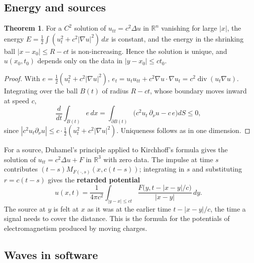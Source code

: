 \documentclass[11pt,a4paper]{article}
\numberwithin{equation}{section}
\theoremstyle{definition}
\newtheorem{thm}{Theorem}[subsection]
\begin{document}
\subsection{Energy and sources}
\label{ssec:energynd}

\begin{thm}
\label{thm:energynd}
For a $C^2$ solution of $u_{tt} = c^2\Delta u$ in $\mathbb R^n$ vanishing for large $|x|$, the energy $E = \frac12\int(u_t^2 + c^2|\nabla u|^2)\,dx$ is constant, and the energy in the shrinking ball $|x - x_0| \leq R - ct$ is non-increasing. Hence the solution is unique, and $u(x_0, t_0)$ depends only on the data in $|y - x_0| \leq ct_0$.
\end{thm}

\begin{proof}
With $e = \frac12(u_t^2 + c^2|\nabla u|^2)$, $e_t = u_tu_{tt} + c^2\nabla u\cdot\nabla u_t = c^2\operatorname{div}(u_t\nabla u)$. Integrating over the ball $B(t)$ of radius $R - ct$, whose boundary moves inward at speed $c$,
\[
\frac{d}{dt}\int_{B(t)}e\,dx = \int_{\partial B(t)}\bigl(c^2u_t\,\partial_\nu u - c\,e\bigr)dS \leq 0 ,
\]
since $|c^2u_t\partial_\nu u| \leq c\cdot\frac12(u_t^2 + c^2|\nabla u|^2)$. Uniqueness follows as in one dimension.
\end{proof}

For a source, Duhamel's principle applied to Kirchhoff's formula gives the solution of $u_{tt} = c^2\Delta u + F$ in $\mathbb R^3$ with zero data. The impulse at time $s$ contributes $(t - s)M_{F(\cdot, s)}(x, c(t - s))$; integrating in $s$ and substituting $r = c(t - s)$ gives the \textbf{retarded potential}
\begin{equation}
\label{eq:retarded}
u(x, t) = \frac{1}{4\pi c^2}\int_{|y - x| \leq ct}\frac{F\bigl(y, t - |x - y|/c\bigr)}{|x - y|}\,dy .
\end{equation}
The source at $y$ is felt at $x$ as it was at the earlier time $t - |x - y|/c$, the time a signal needs to cover the distance. This is the formula for the potentials of electromagnetism produced by moving charges.

\subsection{Waves in software}
\label{ssec:software5}
\end{document}
